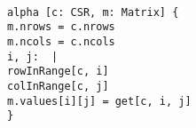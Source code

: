 \begin{myquote}\small{\texttt{\\
\Bpred alpha [c: CSR, m: Matrix] \{\\
\TA m.nrows = c.nrows\\
\TA m.ncols = c.ncols\\
\TA \Ball i, j: \Bint~|\\
\TB rowInRange[c, i] \Band\\
\TB colInRange[c, j] \Bimplies\\
\TC m.values[i][j] = get[c, i, j]\\
\}
}}
\end{myquote}